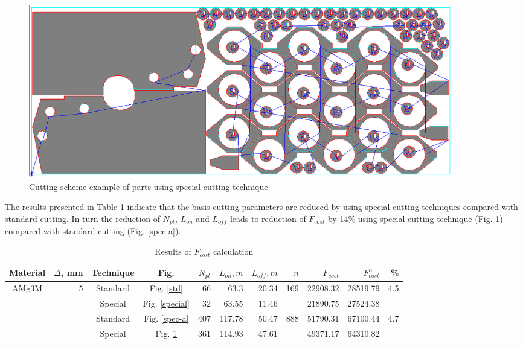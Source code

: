 \documentclass[runningheads]{llncs}
\begin{document}
\begin{figure}
  \begin{center}
  \includegraphics[width=0.9\textwidth]{spec-b.png}
  \caption{Cutting scheme example of parts using special cutting technique}
  \label{spec-b}
  \end{center}
\end{figure}

The results presented in Table \ref{f-cost} indicate that
the basis cutting parameters are reduced by using special cutting techniques
compared with standard cutting.
In turn the reduction of $N_{pt}$, $L_{on}$ and $L_{off}$
leads to reduction of $F_{cost}$  by 14\%
using special cutting technique (Fig. \ref{spec-b})
compared with standard cutting (Fig. \ref{spec-a}).

\begin{table}
  \begin{tabular}{c r | c c | r r r | r | r r | r}
  Material & $\Delta$, mm & Technique & Fig. & $N_{pt}$ & $L_{on}, m$ & $L_{off}, m$ & $n$ & $F_{cost}$ & $F^n_{cost}$ & \% \\
  \hline \hline
  \multirow{4}{*}{AMg3M} & \multirow{4}{*}{5} & Standard & Fig. \ref{std}     & 66  & 63.3   & 20.34 & \multirow{2}{*}{169} & 22908.32 & 28519.79 & \multirow{2}{*}{4.5} \\
                         &                    & Special  & Fig. \ref{special} & 32  & 63.55  & 11.46 &                      & 21890.75 & 27524.38 & \\
                         &                    & Standard & Fig. \ref{spec-a}  & 407 & 117.78 & 50.47 & \multirow{2}{*}{888} & 51790.31 & 67100.44 & \multirow{2}{*}{4.7}\\
                         &                    & Special  & Fig. \ref{spec-b}  & 361 & 114.93 & 47.61 &                      & 49371.17 & 64310.82 & \\
  \hline
  \end{tabular}
  \caption{Results of $F_{cost}$ calculation}
  \label{f-cost}
\end{table}
\end{document}
